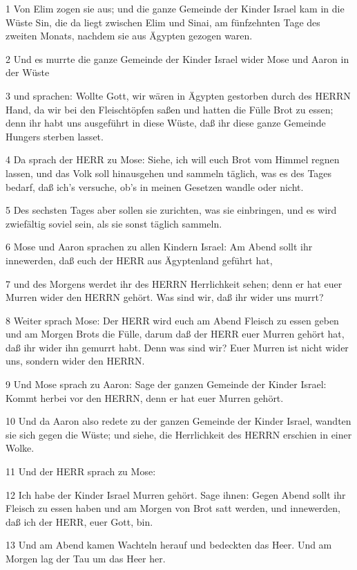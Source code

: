 \par 1 Von Elim zogen sie aus; und die ganze Gemeinde der Kinder Israel kam in die Wüste Sin, die da liegt zwischen Elim und Sinai, am fünfzehnten Tage des zweiten Monats, nachdem sie aus Ägypten gezogen waren.
\par 2 Und es murrte die ganze Gemeinde der Kinder Israel wider Mose und Aaron in der Wüste
\par 3 und sprachen: Wollte Gott, wir wären in Ägypten gestorben durch des HERRN Hand, da wir bei den Fleischtöpfen saßen und hatten die Fülle Brot zu essen; denn ihr habt uns ausgeführt in diese Wüste, daß ihr diese ganze Gemeinde Hungers sterben lasset.
\par 4 Da sprach der HERR zu Mose: Siehe, ich will euch Brot vom Himmel regnen lassen, und das Volk soll hinausgehen und sammeln täglich, was es des Tages bedarf, daß ich's versuche, ob's in meinen Gesetzen wandle oder nicht.
\par 5 Des sechsten Tages aber sollen sie zurichten, was sie einbringen, und es wird zwiefältig soviel sein, als sie sonst täglich sammeln.
\par 6 Mose und Aaron sprachen zu allen Kindern Israel: Am Abend sollt ihr innewerden, daß euch der HERR aus Ägyptenland geführt hat,
\par 7 und des Morgens werdet ihr des HERRN Herrlichkeit sehen; denn er hat euer Murren wider den HERRN gehört. Was sind wir, daß ihr wider uns murrt?
\par 8 Weiter sprach Mose: Der HERR wird euch am Abend Fleisch zu essen geben und am Morgen Brots die Fülle, darum daß der HERR euer Murren gehört hat, daß ihr wider ihn gemurrt habt. Denn was sind wir? Euer Murren ist nicht wider uns, sondern wider den HERRN.
\par 9 Und Mose sprach zu Aaron: Sage der ganzen Gemeinde der Kinder Israel: Kommt herbei vor den HERRN, denn er hat euer Murren gehört.
\par 10 Und da Aaron also redete zu der ganzen Gemeinde der Kinder Israel, wandten sie sich gegen die Wüste; und siehe, die Herrlichkeit des HERRN erschien in einer Wolke.
\par 11 Und der HERR sprach zu Mose:
\par 12 Ich habe der Kinder Israel Murren gehört. Sage ihnen: Gegen Abend sollt ihr Fleisch zu essen haben und am Morgen von Brot satt werden, und innewerden, daß ich der HERR, euer Gott, bin.
\par 13 Und am Abend kamen Wachteln herauf und bedeckten das Heer. Und am Morgen lag der Tau um das Heer her.
